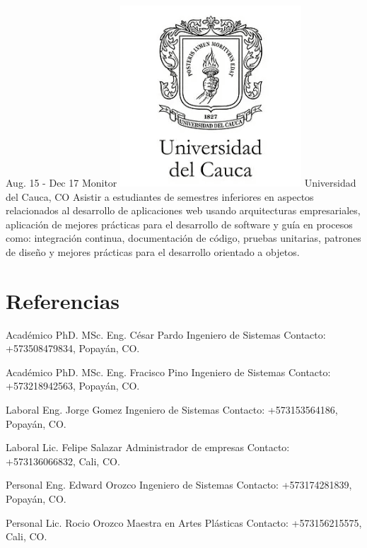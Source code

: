 \documentclass[]{cv-class}
\begin{document}
\begin{entrylist}
	\entry
	{Aug. 15 - Dec 17}
	{Monitor}
	{{\includegraphics[scale=0.05]{img/unicauca-logo.png}} Universidad del Cauca, CO} 
	{\justifying Asistir a estudiantes de semestres inferiores en aspectos relacionados al desarrollo de aplicaciones web usando arquitecturas empresariales, aplicación de mejores prácticas para el desarrollo de software y guía en procesos como: integración continua, documentación de código, pruebas unitarias, patrones de diseño y mejores prácticas para el desarrollo orientado a objetos.}
	
\end{entrylist}


\section{Referencias}
\begin{entrylist}
	  
	\entry
	{Académico}
	{PhD. MSc. Eng. César Pardo}
	{Ingeniero de Sistemas} 
	{Contacto: +573508479834, Popayán, CO.}
	
	\entry
	{Académico}
	{PhD. MSc. Eng. Fracisco Pino}
	{Ingeniero de Sistemas} 
	{Contacto: +573218942563, Popayán, CO.}
	
	\entry
	{Laboral}
	{Eng. Jorge Gomez}
	{Ingeniero de Sistemas} 
	{Contacto: +573153564186, Popayán, CO.}
	
	\entry
	{Laboral}
	{Lic. Felipe Salazar}
	{Administrador de empresas} 
	{Contacto: +573136066832, Cali, CO.}
	
	\entry
	{Personal}
	{Eng. Edward Orozco}
	{Ingeniero de Sistemas} 
	{Contacto: +573174281839, Popayán, CO.}
	
	\entry
	{Personal}
	{Lic. Rocio Orozco}
	{Maestra en Artes Plásticas} 
	{Contacto: +573156215575, Cali, CO.}
	
\end{entrylist}
\end{document}
